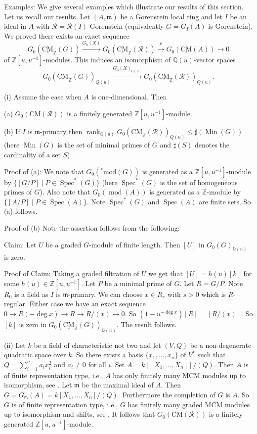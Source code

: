 \documentclass{amsart}
\newcommand{\m}{\mathfrak{m} }
\newcommand{\Z}{\mathbb{Z} }
\newcommand{\Q}{\mathbb{Q} }
\newcommand{\eR}{\mathcal{R} }
\newcommand{\rt}{\rightarrow}
\newcommand{\rank}{\operatorname{rank}}
\newcommand{\Spec}{\operatorname{Spec}}
\newcommand{\CMS}{\operatorname{\underline{CM}}}
\newcommand{\md}{\operatorname{mod}}
\newcommand{\smod}{\operatorname{^*mod}}
\newcommand{\Min}{\operatorname{Min}}
\theoremstyle{plain}
\theoremstyle{definition}
\theoremstyle{remark}
\begin{document}
{\s Examples: We give several examples which illustrate our results of this section.
Let us recall our results. Let $(A,\m)$ be a  Gorenstein local ring and let $I$ be an ideal in $A$ with $\eR = \eR(I)$ Gorenstein (equivalently $G = G_I(A)$ is Gorenstein). We proved
there exists an exact sequence
 $$G_0(\CMS_\Z(G)) \xrightarrow{G_0(X)} G_0(\CMS_\Z(\eR)) \xrightarrow{\rho} G_0(\CMS(A)) \rt 0$$ of $\Z[u,u^{-1}]$-modules.
 This induces an isomorphism  of $\Q(u)$-vector spaces
 $$ G_0(\CMS_\Z(G))_{Q(u)} \xrightarrow{G_0(X)_{\Q(u)}} G_0(\CMS_\Z(\eR))_{Q(u)}.$$

(i) Assume the case when  $A$ is one-dimensional. Then

(a) $G_0(\CMS(\eR))$ is a finitely generated $\Z[u,u^{-1}]$-module.

(b) If $I$ is $\m$-primary then $\rank_{\Q(u)} G_0(\CMS_\Z(\eR))_{Q(u)} \leq \sharp(\Min (G))$  (here $\Min(G)$ is the set of minimal primes of $G$ and $\sharp(S)$ denotes the cardinality of a set $S$).

Proof of (a):  We note that $G_0(\smod(G))$ is generated as a $\Z[u,u^{-1}]$-module by $\{[G/P] \mid P \in \Spec^*(G) \}$ (here $\Spec^*(G)$ is the set of homogeneous primes of $G$). Also note that $G_0(\md(A))$  is generated as a $\Z$-module by $\{[A/P] \mid P \in \Spec(A) \}$.  Note $\Spec^*(G)$ and $\Spec(A)$ are finite sets. So (a) follows.

Proof of (b) Note the assertion follows from the following:

Claim: Let $U$ be a graded $G$-module of finite length. Then $[U]$ in $G_0(G)_{\Q(u)}$ is zero.

Proof of Claim: Taking a graded  filtration of $U$ we get that $[U] = h(u)[k]$ for some $h(u) \in \Z[u,u^{-1}]$.
Let $P$ be a minimal prime of $G$. Let $R = G/P$. Note  $R_0$ is  a field as $I$ is $\m$-primary. We  can choose $x\in R_s$  with $s > 0$ which is $R$-regular.
Either case we have an exact sequence  $0 \rt R(-\deg x) \rt R \rt R/(x) \rt 0$. So $(1- u^{-\deg x})[R] = [R/(x)] $. So $[k]$ is  zero in $G_0(\CMS_\Z(G))_{\Q(u)}$. The result follows.


(ii) Let $k$ be a field of characteristic not two and let $(V, Q)$ be a non-degenerate quadratic space over $k$. So there exists a basis $\{ x_1, \ldots, x_n \}$ of $V^*$ such that $Q = \sum_{i=1}^{n}a_ix_i^2$ and $a_i \neq 0$ for all $i$. Set $A = k[[X_1, \ldots, X_n]]/(Q)$. Then $A$ is of finite representation type, i.e., $A$ has only finitely many MCM modules up to isomorphism, see \cite[14.10]{Y}. Let $\m$ be the maximal ideal of $A$. Then $G = G_\m(A) = k[X_1, \ldots, X_n]/(Q)$. Furthermore the completion of $G$ is $A$. So $G$ is of finite representation type, i.e., $G$ has finitely many graded MCM modules up to isomorphism and shifts, see \cite[15.1]{Y}. It follows that $G_0(\CMS(\eR))$ is a finitely generated $\Z[u,u^{-1}]$-module.

}
\end{document}
